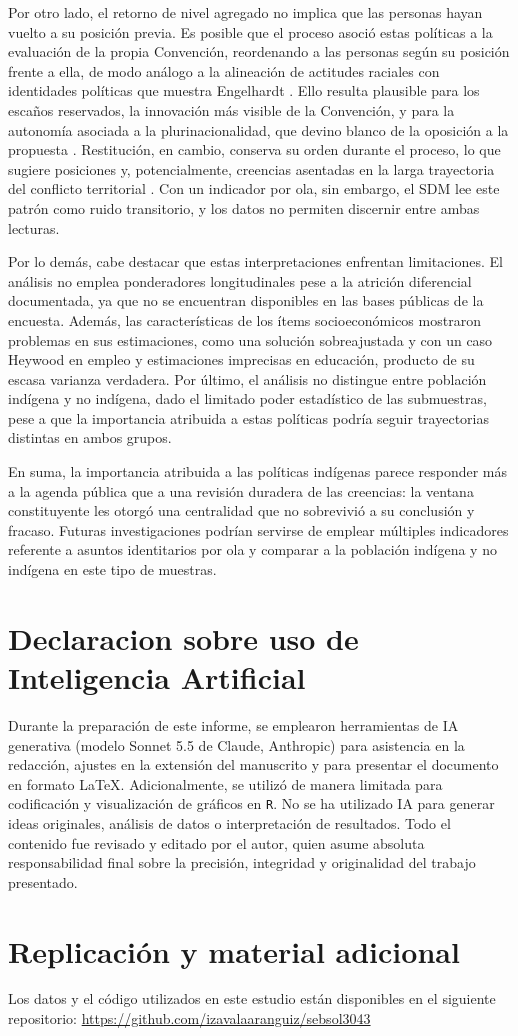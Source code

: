\documentclass{article}
\begin{document}
Por otro lado, el retorno de nivel agregado no implica que las personas hayan vuelto a su posición previa. Es posible que el proceso asoció estas políticas a la evaluación de la propia Convención, reordenando a las personas según su posición frente a ella, de modo análogo a la alineación de actitudes raciales con identidades políticas que muestra Engelhardt \parencite*{engelhardt2021}. Ello resulta plausible para los escaños reservados, la innovación más visible de la Convención, y para la autonomía asociada a la plurinacionalidad, que devino blanco de la oposición a la propuesta \parencite{disipavlic2024,herraz2026}. Restitución, en cambio, conserva su orden durante el proceso, lo que sugiere posiciones y, potencialmente, creencias asentadas en la larga trayectoria del conflicto territorial \parencite{pairican2021}. Con un indicador por ola, sin embargo, el SDM lee este patrón como ruido transitorio, y los datos no permiten discernir entre ambas lecturas.

Por lo demás, cabe destacar que estas interpretaciones enfrentan limitaciones. El análisis no emplea ponderadores longitudinales pese a la atrición diferencial documentada, ya que no se encuentran disponibles en las bases públicas de la encuesta. Además, las características de los ítems socioeconómicos mostraron problemas en sus estimaciones, como una solución sobreajustada y con un caso Heywood en empleo y estimaciones imprecisas en educación, producto de su escasa varianza verdadera. Por último, el análisis no distingue entre población indígena y no indígena, dado el limitado poder estadístico de las submuestras, pese a que la importancia atribuida a estas políticas podría seguir trayectorias distintas en ambos grupos. 

En suma, la importancia atribuida a las políticas indígenas parece responder más a la agenda pública que a una revisión duradera de las creencias: la ventana constituyente les otorgó una centralidad que no sobrevivió a su conclusión y fracaso. Futuras investigaciones podrían servirse de emplear múltiples indicadores referente a asuntos identitarios por ola y comparar a la población indígena y no indígena en este tipo de muestras.

\section{Declaracion sobre uso de Inteligencia Artificial}

Durante la preparación de este informe, se emplearon herramientas de IA generativa (modelo Sonnet 5.5 de Claude, Anthropic) para asistencia en la redacción, ajustes en la extensión del manuscrito y para presentar el documento en formato \LaTeX. Adicionalmente, se utilizó de manera limitada para codificación y visualización de gráficos en \texttt{R}. No se ha utilizado IA para generar ideas originales, análisis de datos o interpretación de resultados. Todo el contenido fue revisado y editado por el autor, quien asume absoluta responsabilidad final sobre la precisión, integridad y originalidad del trabajo presentado.

\section{Replicación y material adicional}

Los datos y el código utilizados en este estudio están disponibles en el siguiente repositorio: \url{https://github.com/izavalaaranguiz/sebsol3043}

\printbibliography[title={Referencias}]
\end{document}
